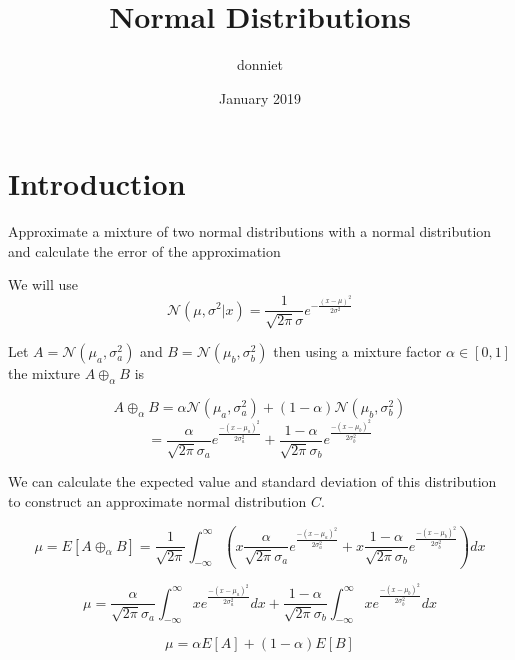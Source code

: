 \documentclass{article}
\title{Normal Distributions}
\author{donniet }
\date{January 2019}
\begin{document}
\maketitle

\section{Introduction}

Approximate a mixture of two normal distributions with a normal distribution and calculate the error of the approximation \par

We will use 
\begin{equation}
\mathcal{N}(\mu, \sigma^2|x)=\frac{1}{\sqrt{2\pi}\sigma} e^{-\frac{(x-\mu)^2}{2\sigma^2}}
\end{equation}

Let $A = \mathcal{N}(\mu_a, \sigma_a^2)$ and $B = \mathcal{N}(\mu_b, \sigma_b^2)$ then using a mixture factor $\alpha \in [0,1]$ the mixture $A \oplus_\alpha B$ is

\begin{equation}
    A \oplus_\alpha B=\alpha \mathcal{N}(\mu_a, \sigma_a^2) + (1-\alpha)\mathcal{N}(\mu_b, \sigma_b^2)
\end{equation}
\begin{equation}
    = \frac{\alpha}{\sqrt{2\pi}\sigma_a} e^{\frac{-(x-\mu_a)^2}{2\sigma_a^2}} + \frac{1-\alpha}{\sqrt{2\pi}\sigma_b}e^{\frac{-(x-\mu_b)^2}{2\sigma_b^2}}
\end{equation}

We can calculate the expected value and standard deviation of this distribution to construct an approximate normal distribution $C$.  

\begin{equation}
    \mu = E\left[A\oplus_\alpha B \right] = \frac{1}{\sqrt{2\pi}} \int_{-\infty}^{\infty} \left( x \frac{\alpha}{\sqrt{2\pi}\sigma_a} e^{\frac{-(x-\mu_a)^2}{2\sigma_a^2}} + x\frac{1-\alpha}{\sqrt{2\pi}\sigma_b}e^{\frac{-(x-\mu_b)^2}{2\sigma_b^2}} \right) dx
\end{equation}

\begin{equation}
    \mu =  \frac{\alpha}{\sqrt{2\pi}\sigma_a} \int_{-\infty}^{\infty} x e^{\frac{-(x-\mu_a)^2}{2\sigma_a^2}} dx + \frac{1-\alpha}{\sqrt{2\pi}\sigma_b}\int_{-\infty}^{\infty} x e^{\frac{-(x-\mu_b)^2}{2\sigma_b^2}} dx
\end{equation}

\begin{equation}
    \mu =  \alpha E[A] + (1-\alpha)E[B]
\end{equation}
\end{document}
